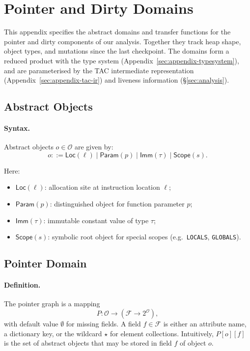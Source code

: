 \section{Pointer and Dirty Domains}
\label{sec:appendix-pointer}

This appendix specifies the abstract domains and transfer functions for the pointer
and dirty components of our analysis.
Together they track heap shape, object types, and mutations since the last checkpoint.
The domains form a reduced product with the type system
(Appendix~\ref{sec:appendix-typesystem}),
and are parameterised by the TAC intermediate representation
(Appendix~\ref{sec:appendix-tac-ir}) and liveness information
(\S\ref{sec:analysis}).

\subsection{Abstract Objects}

\paragraph{Syntax.}
Abstract objects $o \in \mathcal{O}$ are given by:
\[
o ::= \mathsf{Loc}(\ell) \mid \mathsf{Param}(p) \mid \mathsf{Imm}(\tau) \mid \mathsf{Scope}(s).
\]

\noindent
Here:
\begin{itemize}
  \item $\mathsf{Loc}(\ell)$: allocation site at instruction location $\ell$;
  \item $\mathsf{Param}(p)$: distinguished object for function parameter $p$;
  \item $\mathsf{Imm}(\tau)$: immutable constant value of type $\tau$;
  \item $\mathsf{Scope}(s)$: symbolic root object for special scopes
        (e.g.\ \texttt{LOCALS}, \texttt{GLOBALS}).
\end{itemize}

\subsection{Pointer Domain}

\paragraph{Definition.}
The pointer graph is a mapping
\[
P : \mathcal{O} \to (\mathcal{F} \to 2^{\mathcal{O}}),
\]
with default value $\emptyset$ for missing fields.
A field $f \in \mathcal{F}$ is either an attribute name,
a dictionary key, or the wildcard $\star$ for element collections.
Intuitively, $P[o][f]$ is the set of abstract objects that may be
stored in field $f$ of object $o$.


